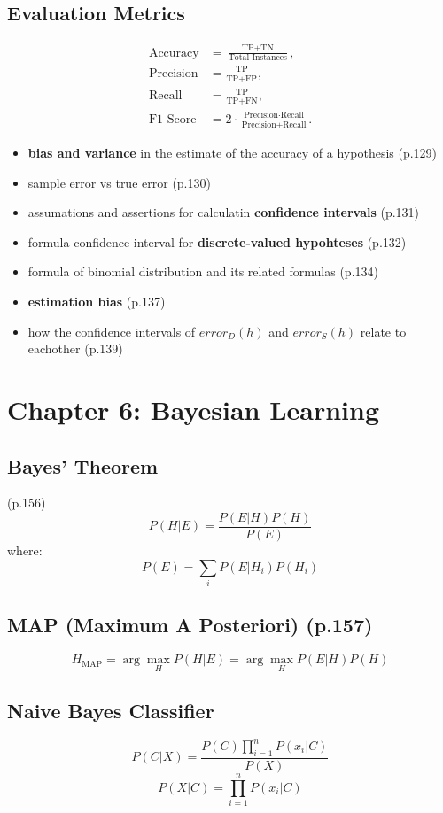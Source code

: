 \documentclass[10pt,a4paper]{article}
\begin{document}
\subsection*{Evaluation Metrics}
\begin{align*}
	\text{Accuracy} &= \frac{\text{TP} + \text{TN}}{\text{Total Instances}}, \\
	\text{Precision} &= \frac{\text{TP}}{\text{TP} + \text{FP}}, \\
	\text{Recall} &= \frac{\text{TP}}{\text{TP} + \text{FN}}, \\
	\text{F1-Score} &= 2 \cdot \frac{\text{Precision} \cdot \text{Recall}}{\text{Precision} + \text{Recall}}.
\end{align*}
\begin{itemize}
	\item \textbf{bias and variance} in the estimate of the accuracy of a hypothesis (p.129)
	\item sample error vs true error (p.130)
	\item assumations and assertions for calculatin \textbf{confidence intervals} (p.131)
	\item formula confidence interval for \textbf{discrete-valued hypohteses} (p.132)
	\item formula of binomial distribution and its related formulas (p.134)
	\item \textbf{estimation bias} (p.137)
	\item how the confidence intervals of $error_{D}(h)$ and $error_{S}(h)$ relate to eachother (p.139)
\end{itemize}
\section*{Chapter 6: Bayesian Learning}
\subsection*{Bayes' Theorem} (p.156)
\[
P(H|E) = \frac{P(E|H)P(H)}{P(E)}
\]
where:
\[
P(E) = \sum_i P(E|H_i)P(H_i)
\]

\subsection*{MAP (Maximum A Posteriori) (p.157)}
\[
H_{\text{MAP}} = \arg\max_H P(H|E) = \arg\max_H P(E|H)P(H)
\]

\subsection*{Naive Bayes Classifier}
\[
P(C|X) = \frac{P(C)\prod_{i=1}^{n}P(x_i|C)}{P(X)}
\]
\[
P(X|C) = \prod_{i=1}^{n}P(x_i|C)
\]
\end{document}
